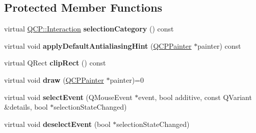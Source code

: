 \subsection*{Protected Member Functions}
\begin{DoxyCompactItemize}
\item 
\hypertarget{classQCPAbstractLegendItem_a53a80054ab329beaca072fb08c08944b}{}virtual \hyperlink{namespaceQCP_a2ad6bb6281c7c2d593d4277b44c2b037}{Q\+C\+P\+::\+Interaction} {\bfseries selection\+Category} () const \label{classQCPAbstractLegendItem_a53a80054ab329beaca072fb08c08944b}

\item 
\hypertarget{classQCPAbstractLegendItem_a71c3baeda42ba78d2cccd97e74110a5e}{}virtual void {\bfseries apply\+Default\+Antialiasing\+Hint} (\hyperlink{classQCPPainter}{Q\+C\+P\+Painter} $\ast$painter) const \label{classQCPAbstractLegendItem_a71c3baeda42ba78d2cccd97e74110a5e}

\item 
\hypertarget{classQCPAbstractLegendItem_abcb540c331b49ef7ee0ea1abbd0dcac3}{}virtual Q\+Rect {\bfseries clip\+Rect} () const \label{classQCPAbstractLegendItem_abcb540c331b49ef7ee0ea1abbd0dcac3}

\item 
\hypertarget{classQCPAbstractLegendItem_a97dedc084c672359710f16b31d046d1d}{}virtual void {\bfseries draw} (\hyperlink{classQCPPainter}{Q\+C\+P\+Painter} $\ast$painter)=0\label{classQCPAbstractLegendItem_a97dedc084c672359710f16b31d046d1d}

\item 
\hypertarget{classQCPAbstractLegendItem_abcfe9e335d99c7fac74e03d26723c1b7}{}virtual void {\bfseries select\+Event} (Q\+Mouse\+Event $\ast$event, bool additive, const Q\+Variant \&details, bool $\ast$selection\+State\+Changed)\label{classQCPAbstractLegendItem_abcfe9e335d99c7fac74e03d26723c1b7}

\item 
\hypertarget{classQCPAbstractLegendItem_ae64e667e7c5b85cd92c9b91928faef28}{}virtual void {\bfseries deselect\+Event} (bool $\ast$selection\+State\+Changed)\label{classQCPAbstractLegendItem_ae64e667e7c5b85cd92c9b91928faef28}

\end{DoxyCompactItemize}
